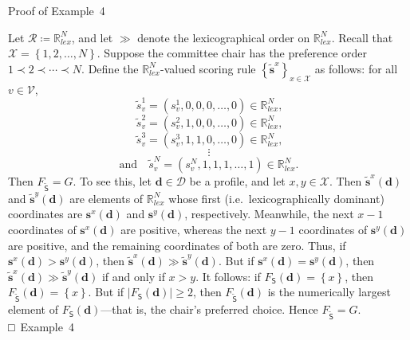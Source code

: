 \documentclass[
]{article}
\begin{document}
Proof of Example~4

Let \(\mathcal{R} ≔ \mathbb{R}_{lex}^{N}\), and let \(\gg\) denote the
lexicographical order on \(\mathbb{R}_{lex}^{N}\). Recall that
\(\mathcal{X} = \left\{ 1,2,\ldots,N \right\}\). Suppose the committee
chair has the preference order \(1 \prec 2 \prec \cdots \prec N\).
Define the \(\mathbb{R}_{lex}^{N}\)-valued scoring rule
\(\left\{ {\widetilde{\mathbf{s}}}^{x} \right\}_{x \in \mathcal{X}}\) as
follows: for all \(v \in \mathcal{V}\),
\[{\widetilde{s}}_{v}^{1} = \left( s_{v}^{1},0,0,0,\ldots,0 \right) \in \mathbb{R}_{lex}^{N}\text{,}\]\[{\widetilde{s}}_{v}^{2} = \left( s_{v}^{2},1,0,0,\ldots,0 \right) \in \mathbb{R}_{lex}^{N}\text{,}\]\[{\widetilde{s}}_{v}^{3} = \left( s_{v}^{3},1,1,0,\ldots,0 \right) \in \mathbb{R}_{lex}^{N}\text{,}\]\[\vdots\]\[\text{and}\quad{\widetilde{s}}_{v}^{N} = \left( s_{v}^{N},1,1,1,\ldots,1 \right) \in \mathbb{R}_{lex}^{N}\text{.}\]
Then \(F_{\widetilde{\mathsf{S}}} = G\). To see this, let
\(\mathbf{d} \in \mathcal{D}\) be a profile, and let
\(x,y \in \mathcal{X}\). Then
\({\widetilde{\mathbf{s}}}^{x}\left( \mathbf{d} \right)\) and
\({\widetilde{\mathbf{s}}}^{y}\left( \mathbf{d} \right)\) are elements
of \(\mathbb{R}_{lex}^{N}\) whose first (i.e.~lexicographically
dominant) coordinates are \(\mathbf{s}^{x}\left( \mathbf{d} \right)\)
and \(\mathbf{s}^{y}\left( \mathbf{d} \right)\), respectively.
Meanwhile, the next \(x - 1\) coordinates of
\(\mathbf{s}^{x}\left( \mathbf{d} \right)\) are positive, whereas the
next \(y - 1\) coordinates of
\(\mathbf{s}^{y}\left( \mathbf{d} \right)\) are positive, and the
remaining coordinates of both are zero. Thus, if
\(\mathbf{s}^{x}\left( \mathbf{d} \right) > \mathbf{s}^{y}\left( \mathbf{d} \right)\),
then
\({\widetilde{\mathbf{s}}}^{x}\left( \mathbf{d} \right) \gg {\widetilde{\mathbf{s}}}^{y}\left( \mathbf{d} \right)\).
But if
\(\mathbf{s}^{x}\left( \mathbf{d} \right) = \mathbf{s}^{y}\left( \mathbf{d} \right)\),
then
\({\widetilde{\mathbf{s}}}^{x}\left( \mathbf{d} \right) \gg {\widetilde{\mathbf{s}}}^{y}\left( \mathbf{d} \right)\)
if and only if \(x > y\). It follows: if
\(F_{\mathsf{S}}\left( \mathbf{d} \right) = \left\{ x \right\}\), then
\(F_{\widetilde{\mathsf{S}}}\left( \mathbf{d} \right) = \left\{ x \right\}\).
But if
\(\left| F_{\mathsf{S}}\left( \mathbf{d} \right) \right| \geq 2\), then
\(F_{\widetilde{\mathsf{S}}}\left( \mathbf{d} \right)\) is the
numerically largest element of
\(F_{\mathsf{S}}\left( \mathbf{d} \right)\)---that is, the chair's
preferred choice. Hence \(F_{\widetilde{\mathsf{S}}} = G\). □~Example~4
\end{document}
